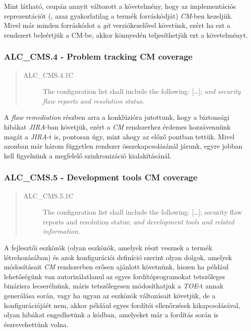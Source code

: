 Mint látható, csupán annyit változott a követelmény, hogy az implementációs reprezentációt (, azaz
gyakorlatilag a termék forráskódját) \emph{CM}-ben kezeljük. Mivel már minden forráskódot
a \emph{git} verziókezelővel követünk, ezért ha ezt a rendszert beleértjük a CM-be, akkor könnyedén
teljesíthetjük ezt a követelményt.

\pagebreak[3]
\subsubsection{ALC\_CMS.4 - Problem tracking CM coverage}
\begin{quote}
    \begin{description}
        \item[ALC\_CMS.4.1C]{The configuration list shall include the following: [\ldots]; \emph{and
            security flaw reports and resolution status}.}
    \end{description}
\end{quote}

A \emph{flaw remediation} részben arra a konklúzióra jutottunk, hogy a biztonsági hibákat
\emph{JIRA}-ban \cite{JIRA} követjük, ezért a \emph{CM} rendszerhez érdemes hozzávennünk magát
a \emph{JIRA}-t is, pontosan úgy, mint ahogy az előző pontban tettük. Mivel azonban már három
független rendszer összekapcsolásánál járunk, egyre jobban kell figyelnünk a megfelelő
szinkronizáció kialakításánál.

\pagebreak[3]
\subsubsection{ALC\_CMS.5 - Development tools CM coverage}
\begin{quote}
    \begin{description}
        \item[ALC\_CMS.5.1C]{The configuration list shall include the following: [\ldots]; security
            flaw reports and resolution status; \emph{and development tools and related
            information}.}
    \end{description}
\end{quote}

A fejlesztői eszközök (olyan eszközök, amelyek részt vesznek a termék létrehozásában) és azok
konfigurációi definíció szerint olyan dolgok, amelyek módosításait \emph{CM} rendszerben erősen
ajánlott követnünk, hiszen ha például lehetőségünk van autorizálatlanul az egyes fordítóprogramokat
tetszőleges binárisra lecserélnünk, máris tetszőlegesen módosíthatjuk a \emph{TOE}-t annak
generálása során, vagy ha ugyan az eszközök változásait követjük, de a konfigurációjáét nem, akkor
például egyes fordítói ellenőrzések kikapcsolásával, olyan hibákat engedhetünk a kódban, amelyeket
már a fordítás során is észrevehettünk volna.

